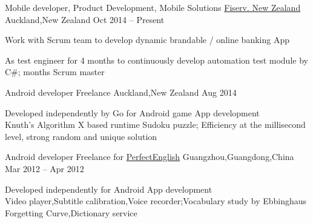 
\begin{cventries}
	\cventry
	{Mobile developer, Product Development, Mobile Solutions}
	{\href{https://www.careers.fiserv.com/new-zealand}{Fiserv. New Zealand}}
	{Auckland,\enskip New Zealand}
	{Oct 2014 – Present}
	{
		\begin{cvitems}
			\item {Work with Scrum team to develop dynamic brandable \href{https://play.google.com/store/apps/details?id=com.fiserv.touchbankingasp&hl=en}{\color{deepblue}{Android}}/\href{https://itunes.apple.com/us/app/touchbanking/id386678211?mt=8}{\color{deepblue}{iPhone}} online banking App}
			\item {As test engineer for 4 months to continuously develop automation test module by C\#; months Scrum master}
		\end{cvitems}
	}
\end{cventries}

\begin{cventries}
	\cventry
	{Android developer}
	{Freelance}
	{Auckland,\enskip New Zealand}
	{Aug 2014}
	{
		\begin{cvitems}
			\item {Developed independently by Go for Android \href{https://play.google.com/store/apps/details?id=com.gmail.jiangyang5157.sudoku}{\color{deepblue}{Sudoku}} game App development\\
			Knuth's Algorithm X based runtime Sudoku puzzle;\enskip
			Efficiency at the millisecond level, strong random and unique solution}
		\end{cvitems}
	}
\end{cventries}

\begin{cventries}
	\cventry
	{Android developer}
	{Freelance for \href{http://www.english119.cn}{PerfectEnglish}}
	{Guangzhou,\enskip Guangdong,\enskip China}
	{Mar 2012 – Apr 2012}
	{
		\begin{cvitems}
			\item {Developed independently for Android \href{http://shouji.baidu.com/software/11415668.html}{\color{deepblue}{PerfectEnglish}} App development\\
			Video player,\enskip Subtitle calibration,\enskip Voice recorder;\enskip Vocabulary study by Ebbinghaus Forgetting Curve,\enskip Dictionary service}
		\end{cvitems}
	}
\end{cventries}

